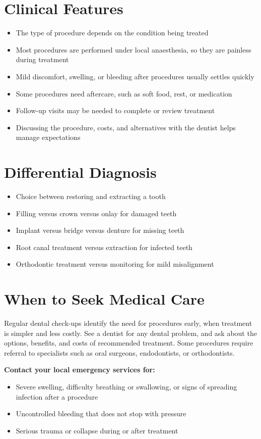 \section*{Clinical Features}
\begin{itemize}
    \item The type of procedure depends on the condition being treated
    \item Most procedures are performed under local anaesthesia, so they are painless during treatment
    \item Mild discomfort, swelling, or bleeding after procedures usually settles quickly
    \item Some procedures need aftercare, such as soft food, rest, or medication
    \item Follow-up visits may be needed to complete or review treatment
    \item Discussing the procedure, costs, and alternatives with the dentist helps manage expectations
\end{itemize}

\section*{Differential Diagnosis}
\begin{itemize}
    \item Choice between restoring and extracting a tooth
    \item Filling versus crown versus onlay for damaged teeth
    \item Implant versus bridge versus denture for missing teeth
    \item Root canal treatment versus extraction for infected teeth
    \item Orthodontic treatment versus monitoring for mild misalignment
\end{itemize}

\section*{When to Seek Medical Care}
Regular dental check-ups identify the need for procedures early, when treatment is simpler and less costly. See a dentist for any dental problem, and ask about the options, benefits, and costs of recommended treatment. Some procedures require referral to specialists such as oral surgeons, endodontists, or orthodontists.

\textbf{Contact your local emergency services for:}
\begin{itemize}
    \item Severe swelling, difficulty breathing or swallowing, or signs of spreading infection after a procedure
    \item Uncontrolled bleeding that does not stop with pressure
    \item Serious trauma or collapse during or after treatment
\end{itemize}


